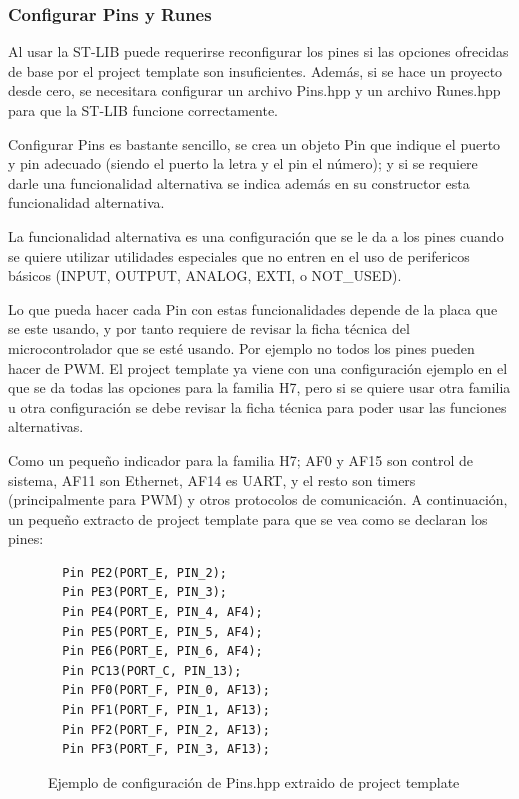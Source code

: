 \documentclass{report}
\begin{document}
\subsubsection{Configurar Pins y Runes}
Al usar la ST-LIB puede requerirse reconfigurar los pines si las opciones ofrecidas de base por el project template son insuficientes. Además, si se hace un proyecto desde cero, se necesitara configurar un archivo Pins.hpp y un archivo Runes.hpp para que la ST-LIB funcione correctamente. 
\par \vspace{0.3cm}
Configurar Pins es bastante sencillo, se crea un objeto Pin que indique el puerto y pin adecuado (siendo el puerto la letra y el pin el número); y si se requiere darle una funcionalidad alternativa se indica además en su constructor esta funcionalidad alternativa. 
\par
La funcionalidad alternativa es una configuración que se le da a los pines cuando se quiere utilizar utilidades especiales que no entren en el uso de perifericos básicos (INPUT, OUTPUT, ANALOG, EXTI, o NOT\_USED). 
\par
Lo que pueda hacer cada Pin con estas funcionalidades depende de la placa que se este usando, y por tanto requiere de revisar la ficha técnica del microcontrolador que se esté usando. Por ejemplo no todos los pines pueden hacer de PWM. El project template ya viene con una configuración ejemplo en el que se da todas las opciones para la familia H7, pero si se quiere usar otra familia u otra configuración se debe revisar la ficha técnica para poder usar las funciones alternativas. \par \vspace{0.3cm}
Como un pequeño indicador para la familia H7; AF0 y AF15 son control de sistema, AF11 son Ethernet, AF14 es UART, y el resto son timers (principalmente para PWM) y otros protocolos de comunicación. A continuación, un pequeño extracto de project template para que se vea como se declaran los pines: 
\begin{figure}[h]
\begin{lstlisting}
  Pin PE2(PORT_E, PIN_2);
  Pin PE3(PORT_E, PIN_3);
  Pin PE4(PORT_E, PIN_4, AF4);
  Pin PE5(PORT_E, PIN_5, AF4);
  Pin PE6(PORT_E, PIN_6, AF4);
  Pin PC13(PORT_C, PIN_13);
  Pin PF0(PORT_F, PIN_0, AF13);
  Pin PF1(PORT_F, PIN_1, AF13);
  Pin PF2(PORT_F, PIN_2, AF13);
  Pin PF3(PORT_F, PIN_3, AF13);
\end{lstlisting}
\caption{Ejemplo de configuración de Pins.hpp extraido de project template}
  \label{PinsConfFile}
\end{figure}
\end{document}
